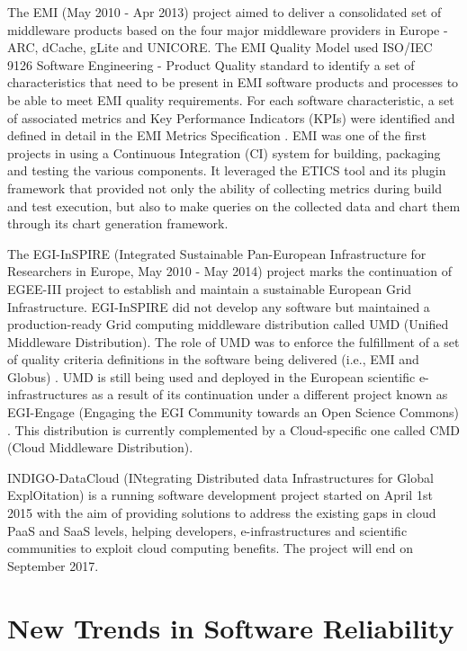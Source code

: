 \documentclass[journal]{IEEEtran}
\begin{document}
The EMI (May 2010 - Apr 2013) project \cite{cordis:emi} aimed to deliver a consolidated set of middleware products based on the four major middleware providers in Europe - ARC, dCache, gLite and UNICORE. The EMI Quality Model used ISO/IEC 9126 Software Engineering - Product Quality standard \cite{iso9126} to identify a set of characteristics that need to be present in EMI software products and processes to be able to meet EMI quality requirements. For each software characteristic, a set of associated metrics and Key Performance Indicators (KPIs) were identified and defined in detail in the EMI Metrics Specification \cite{emi-metrics}. EMI was one of the first projects in using a Continuous Integration (CI) system for building, packaging and testing the various components. It leveraged the ETICS tool and its plugin framework that provided not only the ability of collecting metrics during build and test execution, but also to make queries on the collected data and chart them through its chart generation framework.

The EGI-InSPIRE (Integrated Sustainable Pan-European Infrastructure for Researchers in Europe, May 2010 - May 2014) project \cite{cordis:egi-inspire} marks the continuation of EGEE-III project to establish and maintain a sustainable European Grid Infrastructure. EGI-InSPIRE did not develop any software but maintained a production-ready Grid computing middleware distribution called UMD (Unified Middleware Distribution). The role of UMD was to enforce the fulfillment of a set of quality criteria definitions \cite{egi-qc} in the software being delivered (i.e., EMI and Globus) \cite{mario}. UMD is still being used and deployed in the European scientific e-infrastructures as a result of its continuation under a different project known as EGI-Engage (Engaging the EGI Community towards an Open Science Commons) \cite{cordis:egi-engage}. This distribution is currently complemented by a Cloud-specific one called CMD (Cloud Middleware Distribution).

INDIGO-DataCloud (INtegrating Distributed data Infrastructures for Global ExplOitation) \cite{cordis:indigo} is a running software development project started on April 1st 2015 with the aim of providing solutions to address the existing gaps in cloud PaaS and SaaS levels, helping developers, e-infrastructures and scientific communities to exploit cloud computing benefits. The project will end on September 2017.

\section{New Trends in Software Reliability}
\end{document}
